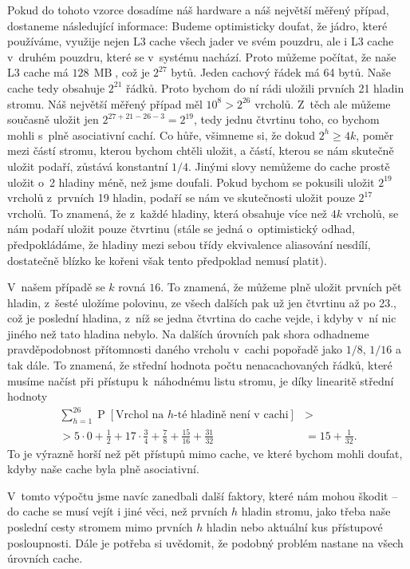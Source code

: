 Pokud do tohoto vzorce dosadíme náš hardware a náš největší měřený případ,
dostaneme následující informace: Budeme optimisticky doufat, že jádro, které používáme, využije nejen L3 cache všech jader ve svém pouzdru, ale i L3 cache v~druhém pouzdru, které se v~systému nachází. Proto můžeme počítat, že naše L3 cache má $128
\,\operatorname{MB}$, což je $2^{27}$ bytů. Jeden cachový řádek má 64 bytů. Naše cache tedy obsahuje $2^{21}$ řádků. Proto bychom do ní rádi uložili prvních 21 hladin stromu. Náš
největší měřený případ měl $ 10^8 > 2 ^ {26}$ vrcholů. Z~těch ale
můžeme současně uložit jen $2^{27 + 21 - 26 - 3} = 2^{19}$, tedy jednu čtvrtinu
toho, co bychom mohli s~plně asociativní cachí. Co hůře, všimneme si, že dokud
$2^h \geq 4k$, poměr mezi částí stromu, kterou bychom chtěli  uložit, a částí,
kterou se nám skutečně uložit podaří, zůstává konstantní $1/4$. Jinými slovy
nemůžeme do cache prostě uložit o~2 hladiny méně, než jsme
doufali. Pokud bychom se pokusili uložit $2^{19}$ vrcholů z~prvních 19
hladin, podaří se nám ve skutečnosti uložit pouze $2^{17}$ vrcholů. To znamená,
že z~každé hladiny, která obsahuje více než $4k$ vrcholů, se nám podaří uložit
pouze čtvrtinu (stále se jedná o~optimistický odhad, předpokládáme, že hladiny
mezi sebou třídy ekvivalence aliasování nesdílí, dostatečně blízko ke kořeni
však tento předpoklad nemusí platit). 

V~našem případě se $k$ rovná $16$. To znamená, že můžeme plně uložit prvních pět hladin,
z~šesté uložíme polovinu, ze všech dalších pak už jen čtvrtinu až po 23., což je
poslední hladina, z~níž se jedna čtvrtina do cache vejde, i kdyby v~ní nic
jiného než tato hladina nebylo. Na dalších úrovních pak shora odhadneme
pravděpodobnost přítomnosti daného vrcholu v~cachi popořadě jako $1/8$, $1/16$
a tak dále. To znamená, že střední hodnota počtu nenacachovaných řádků, které
musíme načíst při přístupu k~náhodnému listu stromu, je díky linearitě střední
hodnoty 
\begin{align*}
\sum_{h=1}^{26} \operatorname{P}[\text{Vrchol na $h$-té hladině není
v~cachi}] &>\\> 5 \cdot 0 +  \frac 12 + 17\cdot \frac34 + \frac78 + \frac{15}{16} + \frac{31}{32} &= 15+\frac1{32}.\end{align*} To je výrazně horší než pět přístupů mimo cache, ve které bychom mohli doufat, kdyby naše cache byla plně asociativní.   

V~tomto výpočtu jsme navíc
zanedbali další faktory, které nám mohou škodit -- do cache se musí vejít i
jiné věci, než prvních $h$ hladin stromu, jako třeba naše poslední
cesty stromem mimo prvních $h$ hladin nebo aktuální kus přístupové
posloupnosti. Dále je potřeba si uvědomit, že podobný problém nastane na všech
úrovních cache.

